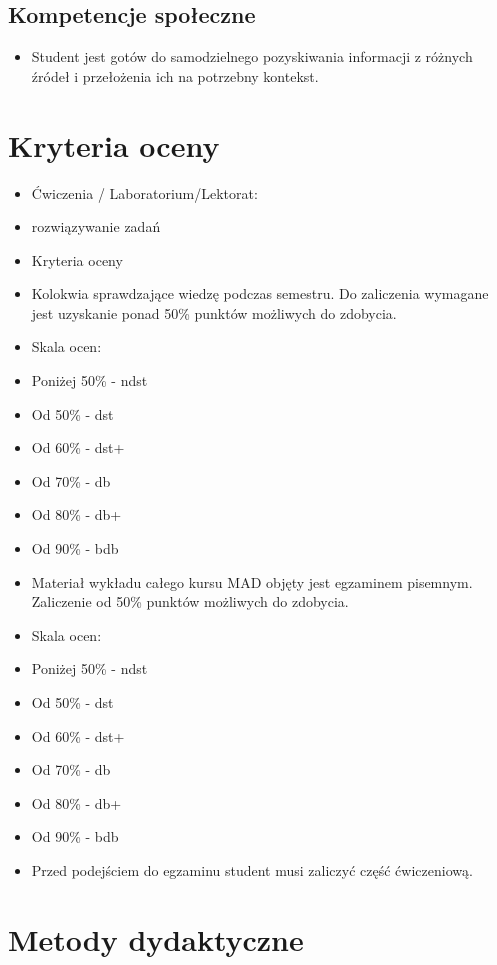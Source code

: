 \documentclass[12pt, a4paper]{article}
\begin{document}
\subsection*{Kompetencje społeczne}
\begin{itemize}
  \item Student jest gotów do samodzielnego pozyskiwania informacji z różnych źródeł i przełożenia ich na potrzebny kontekst.
\end{itemize}

\section{Kryteria oceny}

\begin{itemize}
  \item Ćwiczenia / Laboratorium/Lektorat:
  \item rozwiązywanie zadań
  \item Kryteria oceny
  \item Kolokwia sprawdzające wiedzę podczas semestru. Do zaliczenia wymagane jest uzyskanie ponad 50\% punktów możliwych do zdobycia.
  \item Skala ocen:
  \item Poniżej 50\% - ndst
  \item Od 50\% - dst
  \item Od 60\% - dst+
  \item Od 70\% - db
  \item Od 80\% - db+
  \item Od 90\% - bdb
  \item Materiał wykładu całego kursu MAD objęty jest egzaminem pisemnym. Zaliczenie od 50\% punktów możliwych do zdobycia.
  \item Skala ocen:
  \item Poniżej 50\% - ndst
  \item Od 50\% - dst
  \item Od 60\% - dst+
  \item Od 70\% - db
  \item Od 80\% - db+
  \item Od 90\% - bdb
  \item Przed podejściem do egzaminu student musi zaliczyć część ćwiczeniową.
\end{itemize}

\section{Metody dydaktyczne}
\end{document}
